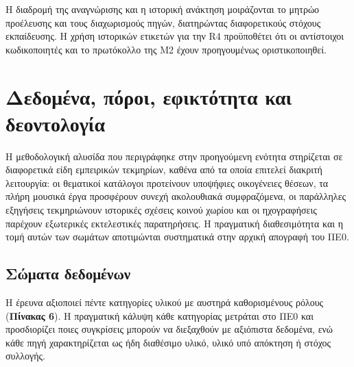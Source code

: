 \documentclass[11pt,a4paper]{article}
\begin{document}
Η διαδρομή της αναγνώρισης και η ιστορική ανάκτηση μοιράζονται το μητρώο προέλευσης και τους διαχωρισμούς πηγών, διατηρώντας διαφορετικούς στόχους εκπαίδευσης. Η χρήση ιστορικών ετικετών για την R4 προϋποθέτει ότι οι αντίστοιχοι κωδικοποιητές και το πρωτόκολλο της Μ2 έχουν προηγουμένως οριστικοποιηθεί.\par

\section{Δεδομένα, πόροι, εφικτότητα και δεοντολογία}\label{ux3b4ux3b5ux3b4ux3bfux3bcux3adux3bdux3b1-ux3c0ux3ccux3c1ux3bfux3b9-ux3b5ux3c6ux3b9ux3baux3c4ux3ccux3c4ux3b7ux3c4ux3b1-ux3baux3b1ux3b9-ux3b4ux3b5ux3bfux3bdux3c4ux3bfux3bbux3bfux3b3ux3afux3b1}

Η μεθοδολογική αλυσίδα που περιγράφηκε στην προηγούμενη ενότητα στηρίζεται σε διαφορετικά είδη εμπειρικών τεκμηρίων, καθένα από τα οποία επιτελεί διακριτή λειτουργία: οι θεματικοί κατάλογοι προτείνουν υποψήφιες οικογένειες θέσεων, τα πλήρη μουσικά έργα προσφέρουν συνεχή ακολουθιακά συμφραζόμενα, οι παράλληλες εξηγήσεις τεκμηριώνουν ιστορικές σχέσεις κοινού χωρίου και οι ηχογραφήσεις παρέχουν εξωτερικές εκτελεστικές παρατηρήσεις. Η πραγματική διαθεσιμότητα και η τομή αυτών των σωμάτων αποτιμώνται συστηματικά στην αρχική απογραφή του ΠΕ0.

\subsection{Σώματα δεδομένων}\label{ux3c3ux3ceux3bcux3b1ux3c4ux3b1-ux3b4ux3b5ux3b4ux3bfux3bcux3adux3bdux3c9ux3bd}

Η έρευνα αξιοποιεί πέντε κατηγορίες υλικού με αυστηρά καθορισμένους ρόλους (\textbf{Πίνακας 6}). Η πραγματική κάλυψη κάθε κατηγορίας μετράται στο ΠΕ0 και προσδιορίζει ποιες συγκρίσεις μπορούν να διεξαχθούν με αξιόπιστα δεδομένα, ενώ κάθε πηγή χαρακτηρίζεται ως ήδη διαθέσιμο υλικό, υλικό υπό απόκτηση ή στόχος συλλογής.
\end{document}
